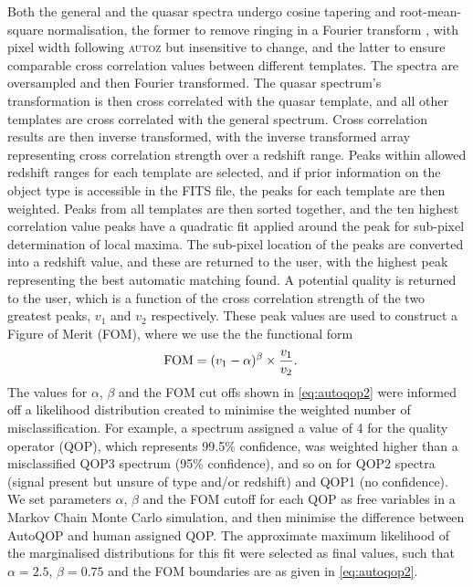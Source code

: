 \documentclass[5p]{elsarticle}
\newcommand{\autoz}{\textsc{autoz}}
\begin{document}
Both the general and the quasar spectra undergo cosine tapering and root-mean-square normalisation, the former to remove ringing in a Fourier transform \citep[apodization;][]{kurtz1998rvsao}, with pixel width following \autoz{} but insensitive to change, and the latter to ensure comparable cross correlation values between different templates. The spectra are oversampled and then Fourier transformed. The quasar spectrum's transformation is then cross correlated with the quasar template, and all other templates are cross correlated with the general spectrum. Cross correlation results are then inverse transformed, with the inverse transformed array representing cross correlation strength over a redshift range. Peaks within allowed redshift ranges for each template are selected, and if prior information on the object type is accessible in the FITS file, the peaks for each template are then weighted. Peaks from all templates are then sorted together, and the ten highest correlation value peaks have a quadratic fit applied around the peak for sub-pixel determination of local maxima. The sub-pixel location of the peaks are converted into a redshift value, and these are returned to the user, with the highest peak representing the best automatic matching found. A potential quality is returned to the user, which is a function of the cross correlation strength of the two greatest peaks, $v_1$ and $v_2$ respectively. These peak values are used to construct a Figure of Merit (FOM), where we use the the functional form
\begin{align}
{\rm FOM} &= (v_1-\alpha)^{\beta} \times \frac{v_1}{v_2}. \label{eq:autoqop}
\end{align}
The values for $\alpha$, $\beta$ and the FOM cut offs shown in \eqref{eq:autoqop2} were informed off a likelihood distribution created to minimise the weighted number of misclassification. For example, a spectrum assigned a value of 4 for the quality operator (QOP), which represents 99.5\% confidence, was weighted higher than a misclassified QOP3 spectrum (95\% confidence), and so on for QOP2 spectra (signal present but unsure of type and/or redshift) and QOP1 (no confidence). We set parameters $\alpha$, $\beta$ and the FOM cutoff for each QOP as free variables in a Markov Chain Monte Carlo simulation, and then minimise the difference between AutoQOP and human assigned QOP. The approximate maximum likelihood of the marginalised distributions for this fit were selected as final values, such that $\alpha = 2.5$, $\beta = 0.75$ and the FOM boundaries are as given in \eqref{eq:autoqop2}.
\end{document}

